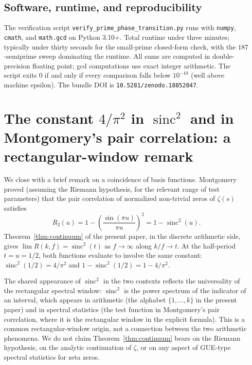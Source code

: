 \documentclass[11pt,reqno]{amsart}
\theoremstyle{plain}
\theoremstyle{definition}
\theoremstyle{remark}
\DeclareMathOperator{\sinc}{sinc}
\begin{document}
\subsection{Software, runtime, and reproducibility}

The verification script
\texttt{verify\_prime\_phase\_transition.py} runs with
\texttt{numpy}, \texttt{cmath}, and \texttt{math.gcd} on Python
3.10+. Total runtime under three minutes; typically under thirty
seconds for the small-prime closed-form check, with the
$187$-semiprime sweep dominating the runtime. All sums are
computed in double-precision floating point; gcd computations
use exact integer arithmetic. The script exits $0$ if and only
if every comparison falls below $10^{-10}$ (well above machine
epsilon). The bundle DOI is \texttt{10.5281/zenodo.18852047}.

\section{The constant $4/\pi^2$ in $\sinc^2$ and in
Montgomery's pair correlation: a rectangular-window remark}
\label{sec:montgomery}

We close with a brief remark on a coincidence of basis functions.
Montgomery~\cite{Montgomery1973} proved (assuming the Riemann
hypothesis, for the relevant range of test parameters) that the
pair correlation of normalized non-trivial zeros of $\zeta(s)$
satisfies
\[
  R_2(u) = 1 - \left(\frac{\sin(\pi u)}{\pi u}\right)^2 = 1 - \sinc^2(u).
\]
Theorem~\ref{thm:continuum} of the present paper, in the
discrete arithmetic side, gives
$\lim R(k, f) = \sinc^2(t)$ as $f \to \infty$ along $k/f \to t$.
At the half-period $t = u = 1/2$, both functions evaluate to
involve the same constant: $\sinc^2(1/2) = 4/\pi^2$ and
$1 - \sinc^2(1/2) = 1 - 4/\pi^2$.

The shared appearance of $\sinc^2$ in the two contexts reflects
the universality of the rectangular spectral window:
$\sinc^2$ is the power spectrum of the indicator of an interval,
which appears in arithmetic (the alphabet $\{1, \ldots, k\}$ in
the present paper) and in spectral statistics (the test function
in Montgomery's pair correlation, where it is the rectangular
window in the explicit formula). This is a common
rectangular-window origin, not a connection between the two
arithmetic phenomena. We do not claim Theorem~\ref{thm:continuum}
bears on the Riemann hypothesis, on the analytic continuation of
$\zeta$, or on any aspect of GUE-type spectral statistics for
zeta zeros.
\end{document}
